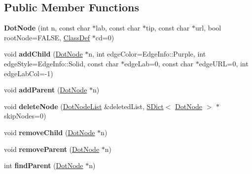 \subsection*{Public Member Functions}
\begin{DoxyCompactItemize}
\item 
\mbox{\label{class_dot_node_aa7e58f70787b510d19e060ef6197d262}} 
{\bfseries Dot\+Node} (int n, const char $\ast$lab, const char $\ast$tip, const char $\ast$url, bool root\+Node=F\+A\+L\+SE, \mbox{\hyperlink{class_class_def}{Class\+Def}} $\ast$cd=0)
\item 
\mbox{\label{class_dot_node_a6ecb5ecd5496056f827fc28c2889f922}} 
void {\bfseries add\+Child} (\mbox{\hyperlink{class_dot_node}{Dot\+Node}} $\ast$n, int edge\+Color=Edge\+Info\+::\+Purple, int edge\+Style=Edge\+Info\+::\+Solid, const char $\ast$edge\+Lab=0, const char $\ast$edge\+U\+RL=0, int edge\+Lab\+Col=-\/1)
\item 
\mbox{\label{class_dot_node_a98f7fc0d1caa3e53622039e86903b04e}} 
void {\bfseries add\+Parent} (\mbox{\hyperlink{class_dot_node}{Dot\+Node}} $\ast$n)
\item 
\mbox{\label{class_dot_node_af941a78a95b973318ccd12882760a3d4}} 
void {\bfseries delete\+Node} (\mbox{\hyperlink{class_dot_node_list}{Dot\+Node\+List}} \&deleted\+List, \mbox{\hyperlink{class_s_dict}{S\+Dict}}$<$ \mbox{\hyperlink{class_dot_node}{Dot\+Node}} $>$ $\ast$skip\+Nodes=0)
\item 
\mbox{\label{class_dot_node_a62686e145c94129d85409214fb3e0571}} 
void {\bfseries remove\+Child} (\mbox{\hyperlink{class_dot_node}{Dot\+Node}} $\ast$n)
\item 
\mbox{\label{class_dot_node_a2a36f34067293e7428ae7ea527678fee}} 
void {\bfseries remove\+Parent} (\mbox{\hyperlink{class_dot_node}{Dot\+Node}} $\ast$n)
\item 
\mbox{\label{class_dot_node_a05f42851921caf9442ed2c4e4468b695}} 
int {\bfseries find\+Parent} (\mbox{\hyperlink{class_dot_node}{Dot\+Node}} $\ast$n)
\item 
\mbox{\label{class_dot_node_a099beb5b92fe76fbffaf1095363198f8}} 

\end{DoxyCompactItemize}
